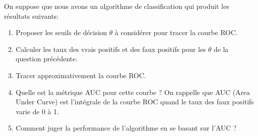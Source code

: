 \documentclass[solutions]{../exercices}
\begin{document}
	\begin{exercice}
		On suppose que nous avons un algorithme de classification qui produit les résultats suivants:
		\begin{table}[h]
			\centering
		\end{table}
		\begin{enumerate}
			\item Proposer les seuils de décision $\theta$ à considérer pour tracer la courbe ROC.
			\item Calculer les taux des vrais positifs et des faux positifs pour les $\theta$ de la question précédente.
			\item Tracer approximativement la courbe ROC.
			\item Quelle est la métrique AUC pour cette courbe ? On rappelle que AUC (Area Under Curve) est l'intégrale de la courbe ROC quand le taux des faux positifs varie de 0 à 1.
			\item Comment juger la performance de l'algorithme en se basant sur l'AUC ?
		\end{enumerate}
	\end{exercice}
	
\end{document}

